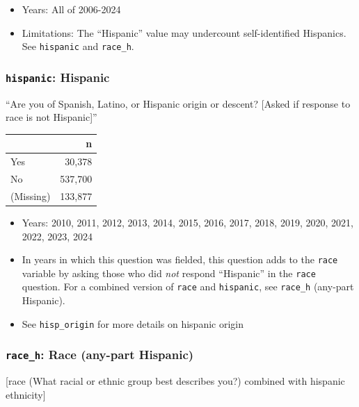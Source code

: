 \documentclass[10pt,article,oneside]{memoir}
\begin{document}
\begin{itemize}
\tightlist
\item
  Years: All of 2006-2024
\item
  Limitations: The ``Hispanic'' value may undercount self-identified
  Hispanics. See \texttt{hispanic} and \texttt{race\_h}.
\end{itemize}

\subsubsection{\texorpdfstring{\texttt{hispanic}:
Hispanic}{hispanic: Hispanic}}\label{hispanic-hispanic}

``Are you of Spanish, Latino, or Hispanic origin or descent? {[}Asked if
response to race is not Hispanic{]}''

\begin{table}[H]
\centering
\begin{tabular}[t]{lr}
\toprule
 & n\\
\midrule
Yes & 30,378\\
No & 537,700\\
(Missing) & 133,877\\
\bottomrule
\end{tabular}
\end{table}

\begin{itemize}
\tightlist
\item
  Years: 2010, 2011, 2012, 2013, 2014, 2015, 2016, 2017, 2018, 2019,
  2020, 2021, 2022, 2023, 2024
\item
  In years in which this question was fielded, this question adds to the
  \texttt{race} variable by asking those who did \emph{not} respond
  ``Hispanic'' in the \texttt{race} question. For a combined version of
  \texttt{race} and \texttt{hispanic}, see \texttt{race\_h} (any-part
  Hispanic).
\item
  See \texttt{hisp\_origin} for more details on hispanic origin
\end{itemize}

\subsubsection{\texorpdfstring{\texttt{race\_h}: Race (any-part
Hispanic)}{race\_h: Race (any-part Hispanic)}}\label{race_h-race-any-part-hispanic}

{[}race (What racial or ethnic group best describes you?) combined with
hispanic ethnicity{]}
\end{document}
